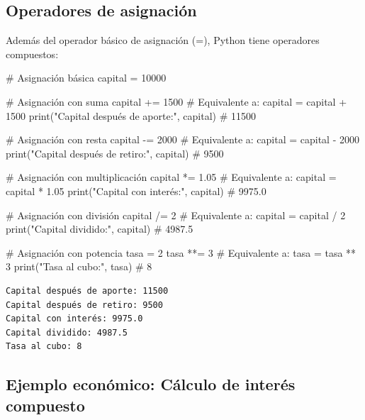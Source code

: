 \documentclass[
  doc,
  floatsintext,
  longtable,
  a4paper,
  nolmodern,
  notxfonts,
  notimes,
  12pt,
  colorlinks=true,linkcolor=blue,citecolor=blue,urlcolor=blue]{apa7}
\newenvironment{Shaded}{\begin{snugshade}}{\end{snugshade}}
\newcommand{\BuiltInTok}[1]{\textcolor[rgb]{0.00,0.23,0.31}{#1}}
\newcommand{\CommentTok}[1]{\textcolor[rgb]{0.37,0.37,0.37}{#1}}
\newcommand{\DecValTok}[1]{\textcolor[rgb]{0.68,0.00,0.00}{#1}}
\newcommand{\FloatTok}[1]{\textcolor[rgb]{0.68,0.00,0.00}{#1}}
\newcommand{\NormalTok}[1]{\textcolor[rgb]{0.00,0.23,0.31}{#1}}
\newcommand{\OperatorTok}[1]{\textcolor[rgb]{0.37,0.37,0.37}{#1}}
\newcommand{\StringTok}[1]{\textcolor[rgb]{0.13,0.47,0.30}{#1}}
\begin{document}
\subsection{Operadores de asignación}\label{operadores-de-asignaciuxf3n}

Además del operador básico de asignación (=), Python tiene operadores
compuestos:

\begin{Shaded}
\begin{Highlighting}[]
\CommentTok{\# Asignación básica}
\NormalTok{capital }\OperatorTok{=} \DecValTok{10000}

\CommentTok{\# Asignación con suma}
\NormalTok{capital }\OperatorTok{+=} \DecValTok{1500}  \CommentTok{\# Equivalente a: capital = capital + 1500}
\BuiltInTok{print}\NormalTok{(}\StringTok{"Capital después de aporte:"}\NormalTok{, capital)  }\CommentTok{\# 11500}

\CommentTok{\# Asignación con resta}
\NormalTok{capital }\OperatorTok{{-}=} \DecValTok{2000}  \CommentTok{\# Equivalente a: capital = capital {-} 2000}
\BuiltInTok{print}\NormalTok{(}\StringTok{"Capital después de retiro:"}\NormalTok{, capital)  }\CommentTok{\# 9500}

\CommentTok{\# Asignación con multiplicación}
\NormalTok{capital }\OperatorTok{*=} \FloatTok{1.05}  \CommentTok{\# Equivalente a: capital = capital * 1.05}
\BuiltInTok{print}\NormalTok{(}\StringTok{"Capital con interés:"}\NormalTok{, capital)  }\CommentTok{\# 9975.0}

\CommentTok{\# Asignación con división}
\NormalTok{capital }\OperatorTok{/=} \DecValTok{2}  \CommentTok{\# Equivalente a: capital = capital / 2}
\BuiltInTok{print}\NormalTok{(}\StringTok{"Capital dividido:"}\NormalTok{, capital)  }\CommentTok{\# 4987.5}

\CommentTok{\# Asignación con potencia}
\NormalTok{tasa }\OperatorTok{=} \DecValTok{2}
\NormalTok{tasa }\OperatorTok{**=} \DecValTok{3}  \CommentTok{\# Equivalente a: tasa = tasa ** 3}
\BuiltInTok{print}\NormalTok{(}\StringTok{"Tasa al cubo:"}\NormalTok{, tasa)  }\CommentTok{\# 8}
\end{Highlighting}
\end{Shaded}

\begin{verbatim}
Capital después de aporte: 11500
Capital después de retiro: 9500
Capital con interés: 9975.0
Capital dividido: 4987.5
Tasa al cubo: 8
\end{verbatim}

\subsection{Ejemplo económico: Cálculo de interés
compuesto}\label{ejemplo-econuxf3mico-cuxe1lculo-de-interuxe9s-compuesto}
\end{document}
